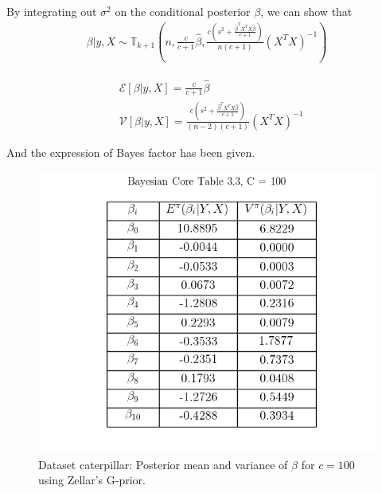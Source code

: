 \documentclass{article}
\begin{document}
By integrating out $\sigma^2$ on the conditional posterior $\beta$, we can show that
\begin{equation}
\begin{aligned}
    \beta | y,X \sim \mathbb{T}_{k+1} (n,\frac{c}{c+1}\hat{\beta},\frac{c(s^2+\frac{\hat{\beta}^{T} X^{T} X \hat{\beta}}{c+1})}{n(c+1)}(X^T X)^{-1})
\end{aligned}
\end{equation}

\begin{equation}
\begin{aligned}
    & \mathcal{E}[\beta|y,X] = \frac{c}{c+1} \hat{\beta} \\
    & \mathcal{V}[\beta|y,X] = \frac{c(s^2+\frac{\hat{\beta}^{T} X^{T} X \hat{\beta}}{c+1})}{(n-2)(c+1)}(X^T X)^{-1}
\end{aligned}
\end{equation}

And the expression of Bayes factor has been given.

\begin{figure}[h!]
\centering
\includegraphics[scale=0.6]{Table3_3.png}
\caption{Dataset caterpillar: Posterior mean and variance of $\beta$ for $c=100$ using Zellar's G-prior.}
\end{figure}
\end{document}
